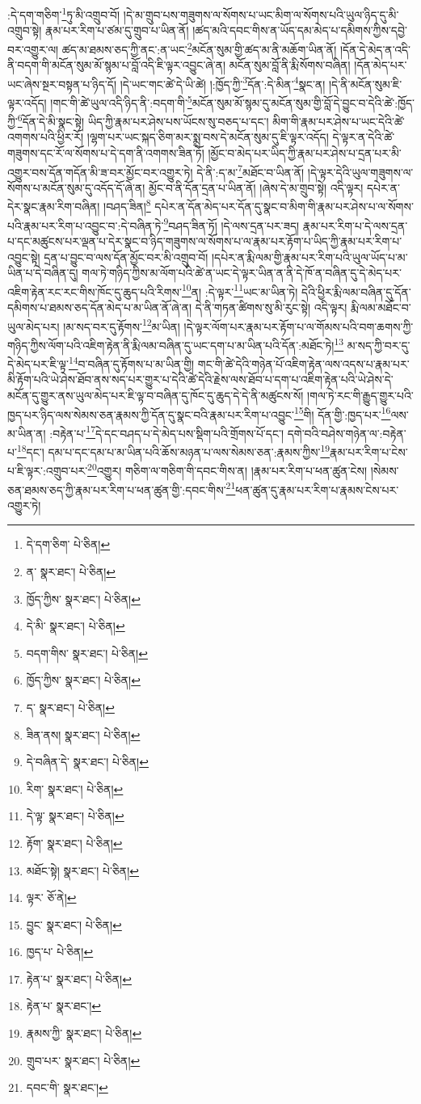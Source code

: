:དེ་དག་གཅིག་\footnote{དེ་དག་ཅིག་  པེ་ཅིན། }ཏུ་མི་འགྲུབ་བོ། །དེ་མ་གྲུབ་པས་གཟུགས་ལ་སོགས་པ་ཡང་མིག་ལ་སོགས་པའི་ཡུལ་ཉིད་དུ་མི་འགྲུབ་སྟེ། རྣམ་པར་རིག་པ་ཙམ་དུ་གྲུབ་པ་ཡིན་ནོ། །ཚད་མའི་དབང་གིས་ན་ཡོད་དམ་མེད་པ་དམིགས་ཀྱིས་དབྱེ་བར་འགྱུར་ལ། ཚད་མ་ཐམས་ཅད་ཀྱི་ནང་:ན་ཡང་\footnote{ན་  སྣར་ཐང་།  པེ་ཅིན། }མངོན་སུམ་གྱི་ཚད་མ་ནི་མཆོག་ཡིན་ནོ། །དོན་དེ་མེད་ན་འདི་ནི་བདག་གི་མངོན་སུམ་མོ་སྙམ་པ་བློ་འདི་ཇི་ལྟར་འབྱུང་ཞེ་ན། མངོན་སུམ་བློ་ནི་རྨི་སོགས་བཞིན། །དོན་མེད་པར་ཡང་ཞེས་སྔར་བསྟན་པ་ཉིད་དོ། །དེ་ཡང་གང་ཚེ་དེ་ཡི་ཚེ། །:ཁྱོད་ཀྱི་\footnote{ཁྱོད་ཀྱིས་  སྣར་ཐང་།  པེ་ཅིན། }དོན་:དེ་མིན་\footnote{དེ་མི་  སྣར་ཐང་།  པེ་ཅིན། }སྣང་ན། །དེ་ནི་མངོན་སུམ་ཇི་ལྟར་འདོད། །གང་གི་ཚེ་ཡུལ་འདི་ཉིད་ནི་:བདག་གི་\footnote{བདག་གིས་  སྣར་ཐང་།  པེ་ཅིན། }མངོན་སུམ་མོ་སྙམ་དུ་མངོན་སུམ་གྱི་བློ་དེ་བྱུང་བ་དེའི་ཚེ་:ཁྱོད་ཀྱི་\footnote{ཁྱོད་ཀྱིས་  སྣར་ཐང་།  པེ་ཅིན། }དོན་དེ་མི་སྣང་སྟེ། ཡིད་ཀྱི་རྣམ་པར་ཤེས་པས་ཡོངས་སུ་བཅད་པ་དང་། མིག་གི་རྣམ་པར་ཤེས་པ་ཡང་དེའི་ཚེ་འགགས་པའི་ཕྱིར་རོ། །ལྷག་པར་ཡང་སྐད་ཅིག་མར་སྨྲ་བས་དེ་མངོན་སུམ་དུ་ཇི་ལྟར་འདོད། དེ་ལྟར་ན་དེའི་ཚེ་གཟུགས་དང་རོ་ལ་སོགས་པ་དེ་དག་ནི་འགགས་ཟིན་ཏོ། །མྱོང་བ་མེད་པར་ཡིད་ཀྱི་རྣམ་པར་ཤེས་པ་དྲན་པར་མི་འགྱུར་བས་དོན་གདོན་མི་ཟ་བར་མྱོང་བར་འགྱུར་ཏེ། དེ་ནི་:ད་མ་\footnote{ད་  སྣར་ཐང་།  པེ་ཅིན། }མཐོང་བ་ཡིན་ནོ། །དེ་ལྟར་དེའི་ཡུལ་གཟུགས་ལ་སོགས་པ་མངོན་སུམ་དུ་འདོད་དོ་ཞེ་ན། མྱོང་བ་ནི་དོན་དྲན་པ་ཡིན་ནོ། །ཞེས་དེ་མ་གྲུབ་སྟེ། འདི་ལྟར། དཔེར་ན་དེར་སྣང་རྣམ་རིག་བཞིན། །བཤད་ཟིན།\footnote{ཟིན་ནས།  སྣར་ཐང་།  པེ་ཅིན། } དཔེར་ན་དོན་མེད་པར་དོན་དུ་སྣང་བ་མིག་གི་རྣམ་པར་ཤེས་པ་ལ་སོགས་པའི་རྣམ་པར་རིག་པ་འབྱུང་བ་:དེ་བཞིན་ཏེ་\footnote{དེ་བཞིན་དེ་  སྣར་ཐང་།  པེ་ཅིན། }བཤད་ཟིན་ཏོ། །དེ་ལས་དྲན་པར་ཟད། རྣམ་པར་རིག་པ་དེ་ལས་དྲན་པ་དང་མཚུངས་པར་ལྡན་པ་དེར་སྣང་བ་ཉིད་གཟུགས་ལ་སོགས་པ་ལ་རྣམ་པར་རྟོག་པ་ཡིད་ཀྱི་རྣམ་པར་རིག་པ་འབྱུང་སྟེ། དྲན་པ་བྱུང་བ་ལས་དོན་མྱོང་བར་མི་འགྲུབ་བོ། །དཔེར་ན་རྨི་ལམ་གྱི་རྣམ་པར་རིག་པའི་ཡུལ་ཡོད་པ་མ་ཡིན་པ་དེ་བཞིན་དུ། གལ་ཏེ་གཉིད་ཀྱིས་མ་ལོག་པའི་ཚེ་ན་ཡང་དེ་ལྟར་ཡིན་ན་ནི་དེ་ཁོ་ན་བཞིན་དུ་དེ་མེད་པར་འཇིག་རྟེན་རང་རང་གིས་ཁོང་དུ་ཆུད་པའི་རིགས་\footnote{རིག་  སྣར་ཐང་།  པེ་ཅིན། }ན། :དེ་ལྟར་\footnote{དེ་ལྟ་  སྣར་ཐང་།  པེ་ཅིན། }ཡང་མ་ཡིན་ཏེ། དེའི་ཕྱིར་རྨི་ལམ་བཞིན་དུ་དོན་དམིགས་པ་ཐམས་ཅད་དོན་མེད་པ་མ་ཡིན་ནོ་ཞེ་ན། དེ་ནི་གཏན་ཚིགས་སུ་མི་རུང་སྟེ། འདི་ལྟར། རྨི་ལམ་མཐོང་བ་ཡུལ་མེད་པར། །མ་སད་བར་དུ་རྟོགས་\footnote{རྟོག་  སྣར་ཐང་།  པེ་ཅིན། }མ་ཡིན། །དེ་ལྟར་ལོག་པར་རྣམ་པར་རྟོག་པ་ལ་གོམས་པའི་བག་ཆགས་ཀྱི་གཉིད་ཀྱིས་ལོག་པའི་འཇིག་རྟེན་ནི་རྨི་ལམ་བཞིན་དུ་ཡང་དག་པ་མ་ཡིན་པའི་དོན་:མཐོང་ཏེ།\footnote{མཐོང་སྟེ།  སྣར་ཐང་།  པེ་ཅིན། } མ་སད་ཀྱི་བར་དུ་དེ་མེད་པར་ཇི་ལྟ་\footnote{ལྟར་  ཅོ་ནེ། }བ་བཞིན་དུ་རྟོགས་པ་མ་ཡིན་གྱི། གང་གི་ཚེ་དེའི་གཉེན་པོ་འཇིག་རྟེན་ལས་འདས་པ་རྣམ་པར་མི་རྟོག་པའི་ཡེ་ཤེས་ཐོབ་ནས་སད་པར་གྱུར་པ་དེའི་ཚེ་དེའི་རྗེས་ལས་ཐོབ་པ་དག་པ་འཇིག་རྟེན་པའི་ཡེ་ཤེས་དེ་མངོན་དུ་གྱུར་ནས་ཡུལ་མེད་པར་ཇི་ལྟ་བ་བཞིན་དུ་ཁོང་དུ་ཆུད་དེ་དེ་ནི་མཚུངས་སོ། །གལ་ཏེ་རང་གི་རྒྱུད་གྱུར་པའི་ཁྱད་པར་ཉིད་ལས་སེམས་ཅན་རྣམས་ཀྱི་དོན་དུ་སྣང་བའི་རྣམ་པར་རིག་པ་འབྱུང་\footnote{བྱུང་  སྣར་ཐང་།  པེ་ཅིན། }གི། དོན་གྱི་:ཁྱད་པར་\footnote{ཁྱད་པ་  པེ་ཅིན། }ལས་མ་ཡིན་ན། :བརྟེན་པ་\footnote{རྟེན་པ་  སྣར་ཐང་།  པེ་ཅིན། }དེ་དང་བཤད་པ་དེ་མེད་པས་སྡིག་པའི་གྲོགས་པོ་དང་། དགེ་བའི་བཤེས་གཉེན་ལ་:བརྟེན་པ་\footnote{རྟེན་པ་  སྣར་ཐང་། }དང་། དམ་པ་དང་དམ་པ་མ་ཡིན་པའི་ཆོས་མཉན་པ་ལས་སེམས་ཅན་:རྣམས་ཀྱིས་\footnote{རྣམས་ཀྱི་  སྣར་ཐང་།  པེ་ཅིན། }རྣམ་པར་རིག་པ་ངེས་པ་ཇི་ལྟར་:འགྲུབ་པར་\footnote{གྲུབ་པར་  སྣར་ཐང་།  པེ་ཅིན། }འགྱུར། གཅིག་ལ་གཅིག་གི་དབང་གིས་ན། །རྣམ་པར་རིག་པ་ཕན་ཚུན་ངེས། །སེམས་ཅན་ཐམས་ཅད་ཀྱི་རྣམ་པར་རིག་པ་ཕན་ཚུན་གྱི་:དབང་གིས་\footnote{དབང་གི་  སྣར་ཐང་། }ཕན་ཚུན་དུ་རྣམ་པར་རིག་པ་རྣམས་ངེས་པར་འགྱུར་ཏེ། 